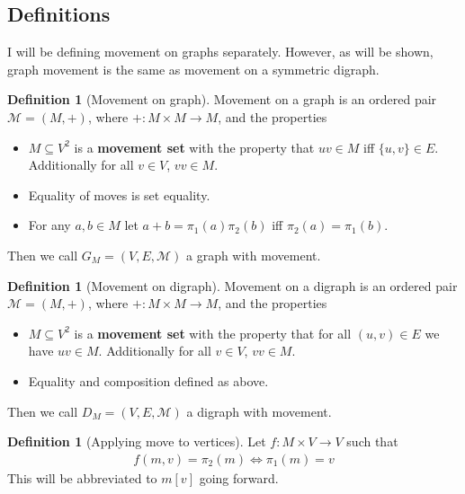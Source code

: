 \documentclass{article}
\theoremstyle{plain}
\theoremstyle{definition}
\newtheorem{definition}[theorem]{Definition}
\begin{document}
\subsection{Definitions}
I will be defining movement on graphs separately. However, as will be
shown, graph movement is the same as movement on a symmetric digraph.
\begin{definition}[Movement on graph]\label{def graph movement}
	Movement on a graph is an ordered pair $\mathcal{M} = (M,+)$,
	where $+:M\times M \rightarrow M$, and the properties
	\begin{itemize}
		\item $M \subseteq V^2$ is a \textbf{movement set} with the 
			property that $uv \in M$ iff $\{u,v\} \in E$. Additionally 
			for all $v \in V$, $vv\in M$.
		\item Equality of moves is set equality.
		\item For any $a,b\in M$ let $a+b = \pi_1(a)\pi_2(b)$ iff
			$\pi_2(a) = \pi_1(b)$.
	\end{itemize}
	Then we call $G_M=(V,E,\mathcal{M})$ a graph with movement.
\end{definition}
\begin{definition}[Movement on digraph]\label{def digraph movement}
	Movement on a digraph is an ordered pair $\mathcal{M} = (M,+)$,
	where $+:M\times M \rightarrow M$, and the properties
	\begin{itemize}
		\item $M \subseteq V^2$ is a \textbf{movement set} with the 
			property that for all $(u,v) \in E$ we have $uv
			\in M$. Additionally for all $v \in V$, $vv\in M$.
		\item Equality and composition defined as above.
	\end{itemize}
	Then we call $D_M=(V,E,\mathcal{M})$ a digraph with movement.
\end{definition}
\begin{definition}[Applying move to vertices]\label{def apply movement}
	Let $f: M \times V \rightarrow V$ such that 
	\begin{equation}
	\begin{aligned}
		f(m,v) = \pi_2(m) \Leftrightarrow \pi_1(m) = v
	\end{aligned}
	\end{equation}
	This will be abbreviated to $m[v]$ going forward.
\end{definition}
\newpage
\end{document}
